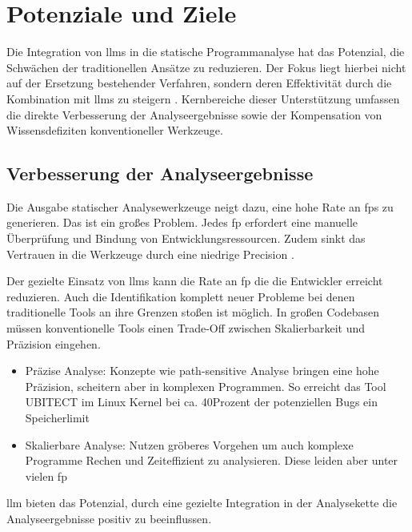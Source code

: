 \section{Potenziale und Ziele}\label{sec:potent}

Die Integration von \acp{llm} in die statische Programmanalyse hat das Potenzial, die Schwächen der traditionellen Ansätze zu reduzieren. Der Fokus liegt hierbei nicht auf der Ersetzung bestehender Verfahren, sondern deren Effektivität durch die Kombination mit \acp{llm} zu steigern \cite{khareUnderstandingEffectivenessLarge2024}. Kernbereiche dieser Unterstützung umfassen die direkte Verbesserung der Analyseergebnisse sowie der Kompensation von Wissensdefiziten konventioneller Werkzeuge.

\subsection{Verbesserung der Analyseergebnisse}

Die Ausgabe statischer Analysewerkzeuge neigt dazu, eine hohe Rate an \acfp{fp} zu generieren. Das ist ein großes Problem. Jedes \ac{fp} erfordert eine manuelle Überprüfung und Bindung von Entwicklungsressourcen. Zudem sinkt das Vertrauen in die Werkzeuge durch eine niedrige Precision \cite{wagnerEffectiveComplementarySecurity2025}.

Der gezielte Einsatz von \acp{llm} kann die Rate an \ac{fp} die die Entwickler erreicht reduzieren\cite{wagnerEffectiveComplementarySecurity2025}. Auch die Identifikation komplett neuer Probleme bei denen traditionelle Tools an ihre Grenzen stoßen ist möglich. In großen Codebasen müssen konventionelle Tools einen Trade-Off zwischen Skalierbarkeit und Präzision eingehen.

\begin{itemize}
    \item Präzise Analyse: Konzepte wie path-sensitive Analyse bringen eine hohe Präzision, scheitern aber in komplexen Programmen. So erreicht das Tool UBITECT im Linux Kernel bei ca. 40Prozent der potenziellen Bugs ein Speicherlimit \cite{liEnhancingStaticAnalysis2024}
\item Skalierbare Analyse: Nutzen gröberes Vorgehen um auch komplexe Programme Rechen und Zeiteffizient zu analysieren. Diese leiden aber unter vielen \ac{fp} 
\end{itemize} 

\ac{llm} bieten das Potenzial, durch eine gezielte Integration in der Analysekette die Analyseergebnisse positiv zu beeinflussen\cite{chapmanInterleavingStaticAnalysis2024}.

